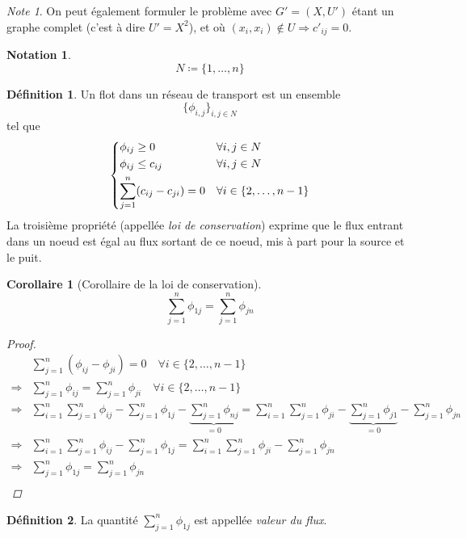\documentclass[a4paper]{report}
\theoremstyle{definition}
\newtheorem*{definition}{Définition}
\newtheorem*{notation}{Notation}
\theoremstyle{remark}
\newtheorem*{note}{Note}
\theoremstyle{plain}
\newtheorem{corollary}{Corollaire}
\begin{document}
\begin{note}
On peut également formuler le problème avec \(G'=(X,U')\) étant un graphe
complet (c'est à dire \(U'=X^2\)), et où \((x_i,x_i)\notin U\Rightarrow
c'_{ij}=0\).
\end{note}

\begin{notation}
\[N\coloneqq\{1,\dots,n\}\]
\end{notation}

\begin{definition}
Un flot dans un réseau de transport est un ensemble
\[\{\phi_{i,j}\}_{i,j\in N}\]
tel que
\[\begin{dcases}
	\phi_{ij}\ge 0                 &\forall i,j\in N\\
	\phi_{ij}\le c_{ij}            &\forall i,j\in N\\
	\sum_{j=1}^n(c_{ij}-c_{ji})=0 &\forall i\in \{2,\dots,n-1\}
\end{dcases}\]
La troisième propriété (appellée \emph{loi de conservation}) exprime que le flux
entrant dans un noeud est égal au flux sortant de ce noeud, mis à part pour la
source et le puit.
\end{definition}

\begin{corollary}[Corollaire de la loi de conservation]
\[\sum_{j=1}^n\phi_{1j}=\sum_{j=1}^n\phi_{jn}\]
\begin{proof}
\begin{align}
	&\sum_{j=1}^n(\phi_{ij}-\phi_{ji})=0\quad\forall i\in\{2,\dots,n-1\}\\
	\Rightarrow&\sum_{j=1}^n\phi_{ij}=\sum_{j=1}^n\phi_{ji}\quad\forall i\in\{2,\dots,n-1\}\\
	\Rightarrow&\sum_{i=1}^n\sum_{j=1}^n\phi_{ij}-\sum_{j=1}^n\phi_{1j}-\underbrace{\sum_{j=1}^n\phi_{nj}}_{=0}
		=\sum_{i=1}^n\sum_{j=1}^n\phi_{ji}-\underbrace{\sum_{j=1}^n\phi_{j1}}_{=0}-\sum_{j=1}^n\phi_{jn}\\
	\Rightarrow&\sum_{i=1}^n\sum_{j=1}^n\phi_{ij}-\sum_{j=1}^n\phi_{1j}=
		\sum_{i=1}^n\sum_{j=1}^n\phi_{ji}-\sum_{j=1}^n\phi_{jn}\\
	\Rightarrow&\sum_{j=1}^n\phi_{1j}=\sum_{j=1}^n\phi_{jn}\\
\end{align}
\end{proof}
\end{corollary}

\begin{definition}
	La quantité \(\sum_{j=1}^n\phi_{1j}\) est appellée \emph{valeur du flux}.
\end{definition}
\end{document}
